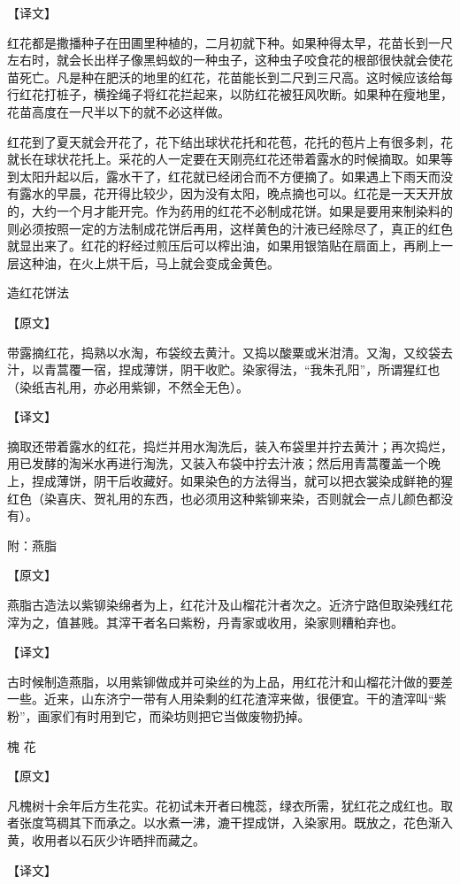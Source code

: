 \documentclass[12pt,UTF8]{ctexbook}
\begin{document}
【译文】

红花都是撒播种子在田圃里种植的，二月初就下种。如果种得太早，花苗长到一尺左右时，就会长出样子像黑蚂蚁的一种虫子，这种虫子咬食花的根部很快就会使花苗死亡。凡是种在肥沃的地里的红花，花苗能长到二尺到三尺高。这时候应该给每行红花打桩子，横拴绳子将红花拦起来，以防红花被狂风吹断。如果种在瘦地里，花苗高度在一尺半以下的就不必这样做。

红花到了夏天就会开花了，花下结出球状花托和花苞，花托的苞片上有很多刺，花就长在球状花托上。采花的人一定要在天刚亮红花还带着露水的时候摘取。如果等到太阳升起以后，露水干了，红花就已经闭合而不方便摘了。如果遇上下雨天而没有露水的早晨，花开得比较少，因为没有太阳，晚点摘也可以。红花是一天天开放的，大约一个月才能开完。作为药用的红花不必制成花饼。如果是要用来制染料的则必须按照一定的方法制成花饼后再用，这样黄色的汁液已经除尽了，真正的红色就显出来了。红花的籽经过煎压后可以榨出油，如果用银箔贴在扇面上，再刷上一层这种油，在火上烘干后，马上就会变成金黄色。

造红花饼法

【原文】

带露摘红花，捣熟以水淘，布袋绞去黄汁。又捣以酸粟或米泔清。又淘，又绞袋去汁，以青蒿覆一宿，捏成薄饼，阴干收贮。染家得法，“我朱孔阳”，所谓猩红也（染纸吉礼用，亦必用紫铆，不然全无色）。

【译文】

摘取还带着露水的红花，捣烂并用水淘洗后，装入布袋里并拧去黄汁；再次捣烂，用已发酵的淘米水再进行淘洗，又装入布袋中拧去汁液；然后用青蒿覆盖一个晚上，捏成薄饼，阴干后收藏好。如果染色的方法得当，就可以把衣裳染成鲜艳的猩红色（染喜庆、贺礼用的东西，也必须用这种紫铆来染，否则就会一点儿颜色都没有）。

附：燕脂

【原文】

燕脂古造法以紫铆染绵者为上，红花汁及山榴花汁者次之。近济宁路但取染残红花滓为之，值甚贱。其滓干者名曰紫粉，丹青家或收用，染家则糟粕弃也。

【译文】

古时候制造燕脂，以用紫铆做成并可染丝的为上品，用红花汁和山榴花汁做的要差一些。近来，山东济宁一带有人用染剩的红花渣滓来做，很便宜。干的渣滓叫“紫粉”，画家们有时用到它，而染坊则把它当做废物扔掉。

槐 花

【原文】

凡槐树十余年后方生花实。花初试未开者曰槐蕊，绿衣所需，犹红花之成红也。取者张度笃稠其下而承之。以水煮一沸，漉干捏成饼，入染家用。既放之，花色渐入黄，收用者以石灰少许晒拌而藏之。

【译文】
\end{document}
